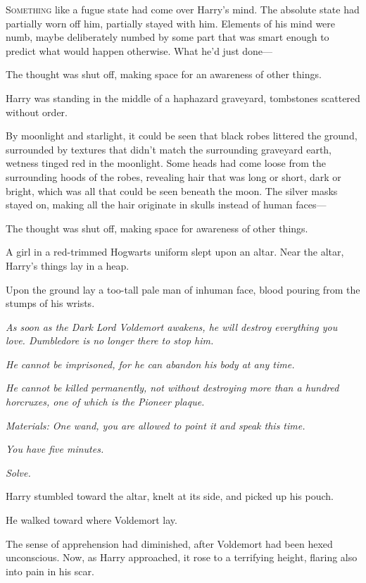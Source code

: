 
\lettrine{S}{omething} like a fugue state had come over Harry’s mind. The absolute state had partially worn off him, partially stayed with him. Elements of his mind were numb, maybe deliberately numbed by some part that was smart enough to predict what would happen otherwise. What he’d just done—

The thought was shut off, making space for an awareness of other things.

Harry was standing in the middle of a haphazard graveyard, tombstones scattered without order.

By moonlight and starlight, it could be seen that black robes littered the ground, surrounded by textures that didn’t match the surrounding graveyard earth, wetness tinged red in the moonlight. Some heads had come loose from the surrounding hoods of the robes, revealing hair that was long or short, dark or bright, which was all that could be seen beneath the moon. The silver masks stayed on, making all the hair originate in skulls instead of human faces—

The thought was shut off, making space for awareness of other things.

A girl in a red-trimmed Hogwarts uniform slept upon an altar. Near the altar, Harry’s things lay in a heap.

Upon the ground lay a too-tall pale man of inhuman face, blood pouring from the stumps of his wrists.

\emph{As soon as the Dark Lord Voldemort awakens, he will destroy everything you love. Dumbledore is no longer there to stop him.}

\emph{He cannot be imprisoned, for he can abandon his body at any time.}

\emph{He cannot be killed permanently, not without destroying more than a hundred horcruxes, one of which is the Pioneer plaque.}

\emph{Materials: One wand, you are allowed to point it and speak this time.}

\emph{You have five minutes.}

\emph{Solve.}

Harry stumbled toward the altar, knelt at its side, and picked up his pouch.

He walked toward where Voldemort lay.

The sense of apprehension had diminished, after Voldemort had been hexed unconscious. Now, as Harry approached, it rose to a terrifying height, flaring also into pain in his scar.

